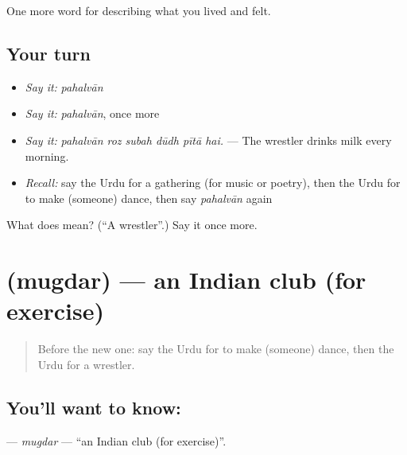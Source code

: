 \begin{grammarlens}[title={What you've built}]
One more word for describing what you lived and felt.
\end{grammarlens}

\subsection*{Your turn}
\begin{itemize}
\raggedright
  \item \emph{Say it:} \emph{pahalvān}
  \item \emph{Say it:} \emph{pahalvān}, once more
  \item \emph{Say it:} \emph{pahalvān roz subah dūdh pītā hai.} — The wrestler drinks milk every morning.
  \item \emph{Recall:} say the Urdu for a gathering (for music or poetry), then the Urdu for to make (someone) dance, then say \emph{pahalvān} again
\end{itemize}

\begin{tcolorbox}[breakable,colback=teal!4,colframe=teal!35!black,title={Before you move on}]
What does  mean? (\textquotedblleft{}A wrestler\textquotedblright{}.) Say it once more.
\end{tcolorbox}
\section[\texorpdfstring{\ur{مگدر} (mugdar)}{مگدر (mugdar)}]{ (mugdar) — an Indian club (for exercise)}

\label{lesson:UR-C520-mugdar}



\begin{quote}
Before the new one: say the Urdu for to make (someone) dance, then the Urdu for a wrestler.
\end{quote}

\subsection*{You'll want to know: }
\textbf{} — \emph{mugdar} — \textquotedblleft{}an Indian club (for exercise)\textquotedblright{}.

\begin{quote}
      
\end{quote}

